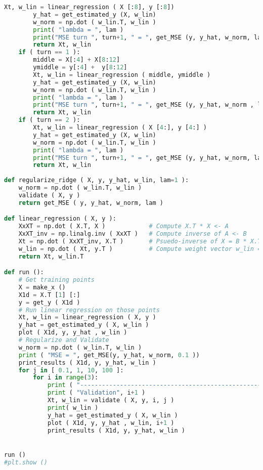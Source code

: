 \documentclass{article}
\begin{document}
\begin{lstlisting}[language=Python,breaklines=true]
        Xt, w_lin = linear_regression ( X [:8], y [:8])
        y_hat = get_estimated_y (X, w_lin)
        w_norm = np.dot ( w_lin.T, w_lin )
        print( "lambda = ", lam )
        print("MSE turn ", turn+1, " = ", get_MSE (y, y_hat, w_norm, lam ))
        return Xt, w_lin
    if ( turn == 1 ):
        middle = X[:4] + X[8:12]
        ymiddle = y[:4] +  y[8:12]
        Xt, w_lin = linear_regression ( middle, ymiddle )
        y_hat = get_estimated_y (X, w_lin)
        w_norm = np.dot ( w_lin.T, w_lin )
        print( "lambda = ", lam )
        print("MSE turn ", turn+1, " = ", get_MSE (y, y_hat, w_norm , lam ))
        return Xt, w_lin
    if ( turn == 2 ):
        Xt, w_lin = linear_regression ( X [4:], y [4:] )
        y_hat = get_estimated_y (X, w_lin)
        w_norm = np.dot ( w_lin.T, w_lin )
        print( "lambda = ", lam )
        print("MSE turn ", turn+1, " = ", get_MSE (y, y_hat, w_norm, lam ))
        return Xt, w_lin
    
def regularize_ridge ( X, y, y_hat, w_lin, lam=1 ):
    w_norm = np.dot ( w_lin.T, w_lin )
    validate ( X, y )
    return get_MSE ( y, y_hat, w_norm, lam )

def linear_regression ( X, y ):
    XxXT = np.dot ( X.T, X )            # Compute X.T * X <- A
    XxXT_inv = np.linalg.inv ( XxXT )   # Compute inverse of A <- B
    Xt = np.dot ( XxXT_inv, X.T )       # Psuedo-inverse of X = B * X.T <- C
    w_lin = np.dot ( Xt, y.T )          # Compute weight vector w_lin = C * y
    return Xt, w_lin.T

def run ():
    # Get training points
    X = make_x ()
    X1d = X.T [1] [:]
    y = get_y ( X1d )
    # Run linear regression on those points
    Xt, w_lin = linear_regression ( X, y )
    y_hat = get_estimated_y ( X, w_lin )
    plot ( X1d, y, y_hat , w_lin )
    # Regularize and Validate
    w_norm = np.dot ( w_lin.T, w_lin )
    print ( "MSE = ", get_MSE(y, y_hat, w_norm, 0.1 ))
    print_results ( X1d, y, y_hat, w_lin )
    for j in [ 0.1, 1, 10, 100 ]:
        for i in range(3):
            print ( "---------------------------------------------------" )
            print ( "Validation", i+1 )
            Xt, w_lin = validate ( X, y, i, j )
            print( w_lin )
            y_hat = get_estimated_y ( X, w_lin )
            plot ( X1d, y, y_hat , w_lin, i+1 )
            print_results ( X1d, y, y_hat, w_lin )


run ()
#plt.show ()


\end{lstlisting}
\newpage
\end{document}

